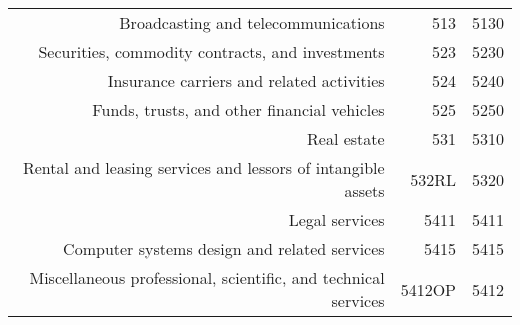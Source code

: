 \begin{table}[H]
\begin{center}
\begin{tabular}{rrr}
Broadcasting and telecommunications                                  & 513         & 5130      \\%
Securities, commodity contracts, and investments                     & 523         & 5230      \\%
Insurance carriers and related activities                            & 524         & 5240      \\%
Funds, trusts, and other financial vehicles                          & 525         & 5250      \\%
Real estate                                                          & 531         & 5310      \\%
Rental and leasing services and lessors of intangible assets         & 532RL       & 5320      \\%
Legal services                                                       & 5411        & 5411      \\%
Computer systems design and related services                         & 5415        & 5415      \\%
Miscellaneous professional, scientific, and technical services       & 5412OP      & 5412      \\%

\end{tabular}
\end{center}
\end{table}
